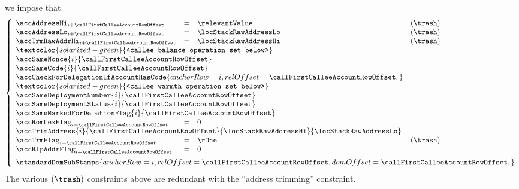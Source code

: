 \begin{description}
		we impose that
		\[
			\left\{ \begin{array}{lcll}
				\accAddressHi    _{i + \callFirstCalleeAccountRowOffset} & = & \relevantValue   & (\trash) \\
				\accAddressLo    _{i + \callFirstCalleeAccountRowOffset} & = & \locStackRawAddressLo & (\trash) \\
				\accTrmRawAddrHi _{i + \callFirstCalleeAccountRowOffset} & = & \locStackRawAddressHi & (\trash) \\
				\multicolumn{4}{l}{\textcolor{solarized-green}{\texttt{<callee balance operation set below>}}} \\
				\multicolumn{4}{l}{\accSameNonce             {i}{\callFirstCalleeAccountRowOffset}} \\
				\multicolumn{4}{l}{\accSameCode              {i}{\callFirstCalleeAccountRowOffset}} \\
				\multicolumn{3}{l}{\accCheckForDelegationIfAccountHasCode {
					anchorRow = i                                ,
					relOffset = \callFirstCalleeAccountRowOffset ,
				}} \\
				\multicolumn{4}{l}{\textcolor{solarized-green}{\texttt{<callee warmth operation set below>}}} \\
				\multicolumn{4}{l}{\accSameDeploymentNumber  {i}{\callFirstCalleeAccountRowOffset}} \\
				\multicolumn{4}{l}{\accSameDeploymentStatus  {i}{\callFirstCalleeAccountRowOffset}} \\
				\multicolumn{4}{l}{\accSameMarkedForDeletionFlag {i}{\callFirstCalleeAccountRowOffset}} \\
				\accRomLexFlag   _{i + \callFirstCalleeAccountRowOffset} & = & 0 \\
				\multicolumn{4}{l}{\accTrimAddress
				{i}{\callFirstCalleeAccountRowOffset}
				{\locStackRawAddressHi}
				{\locStackRawAddressLo}} \\
				\accTrmFlag      _{i + \callFirstCalleeAccountRowOffset} & = & \rOne & (\trash) \\
				\accRlpAddrFlag  _{i + \callFirstCalleeAccountRowOffset} & = & 0 \vspace{2mm} \\
				\multicolumn{4}{l}{
					\standardDomSubStamps {
						anchorRow = i                                ,
						relOffset = \callFirstCalleeAccountRowOffset ,
						domOffset = \callFirstCalleeAccountRowOffset ,
					}
				} \\
			\end{array} \right.
		\]
		\saNote{}
		The various $(\trash)$ constraints above are redundant with the ``address trimming'' constraint.


\end{description}
